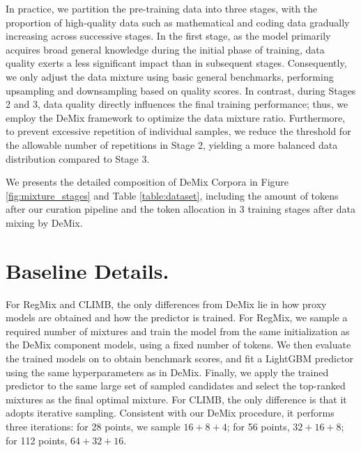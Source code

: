 In practice, we partition the pre-training data into three stages, with the proportion of high-quality data such as mathematical and coding data gradually increasing across successive stages. In the first stage, as the model primarily acquires broad general knowledge during the initial phase of training, data quality exerts a less significant impact than in subsequent stages. Consequently, we only adjust the data mixture using basic general benchmarks, performing upsampling and downsampling based on quality scores. In contrast, during Stages 2 and 3, data quality directly influences the final training performance; thus, we employ the DeMix framework to optimize the data mixture ratio. Furthermore, to prevent excessive repetition of individual samples, we reduce the threshold for the allowable number of repetitions in Stage 2, yielding a more balanced data distribution compared to Stage 3.

We presents the detailed composition of DeMix Corpora in Figure \ref{fig:mixture_stages} and Table \ref{table:dataset}, including the amount of tokens after our curation pipeline and the token allocation in 3 training stages after data mixing by DeMix. 



\section{Baseline Details.}
\label{appd:train_detail}

For RegMix and CLIMB, the only differences from DeMix lie in how proxy models are obtained and how the predictor is trained.
For RegMix, we sample a required number of mixtures and train the model from the same initialization as the DeMix component models, using a fixed number of tokens. We then evaluate the trained models on to obtain benchmark scores, and fit a LightGBM predictor using the same hyperparameters as in DeMix. Finally, we apply the trained predictor to the same large set of sampled candidates and select the top-ranked mixtures as the final optimal mixture.
For CLIMB, the only difference is that it adopts iterative sampling. Consistent with our DeMix procedure, it performs three iterations: for 28 points, we sample $16+8+4$; for 56 points, $32+16+8$; for 112 points, $64+32+16$.




